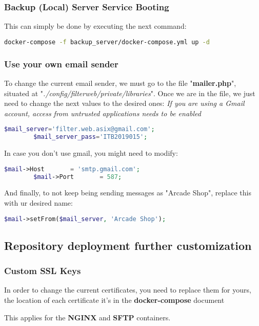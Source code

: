 \subsubsection[Backup (Local) Server Service Booting]{Backup (Local) Server Service Booting}
This can simply be done by executing the next command:
\begin{lstlisting}[language=bash,label={lst:compose-up-bk-Local}]
docker-compose -f backup_server/docker-compose.yml up -d
\end{lstlisting}


\subsubsection[Use your own email sender]{Use your own email sender}
\begin{flushleft}
    To change the current email sender, we must go to the file "\textbf{mailer.php}", situated at "\textit{./config/filterweb/private/libraries}".
    Once we are in the file, we just need to change the next values to the desired ones:
    \textit{If you are using a Gmail account, access from untrusted applications needs to be enabled}
    \begin{lstlisting}[language=php,label={lst:mail_accounts}]
        $mail_server='filter.web.asix@gmail.com';
        $mail_server_pass='ITB2019015';
    \end{lstlisting}
    In case you don't use gmail, you might need to modify:
    \begin{lstlisting}[language=php,label={lst:mail_accounts2}]
        $mail->Host       = 'smtp.gmail.com';
        $mail->Port       = 587;
    \end{lstlisting}
    And finally, to not keep being sending messages as "Arcade Shop", replace this with ur desired name:
    \begin{lstlisting}[language=php,label={lst:mail_accounts3}]
        $mail->setFrom($mail_server, 'Arcade Shop');
    \end{lstlisting}
\end{flushleft}


\newpage
\subsection{Repository deployment further customization}\label{subsec:repository-deployment-further-customization}
\subsubsection[Custom SSL Keys]{Custom SSL Keys}
\begin{flushleft}
    In order to change the current certificates, you need to replace them for yours, the location of each certificate
    it's in the \textbf{docker-compose} document

    This applies for the \textbf{NGINX} and \textbf{SFTP} containers.
\end{flushleft}

